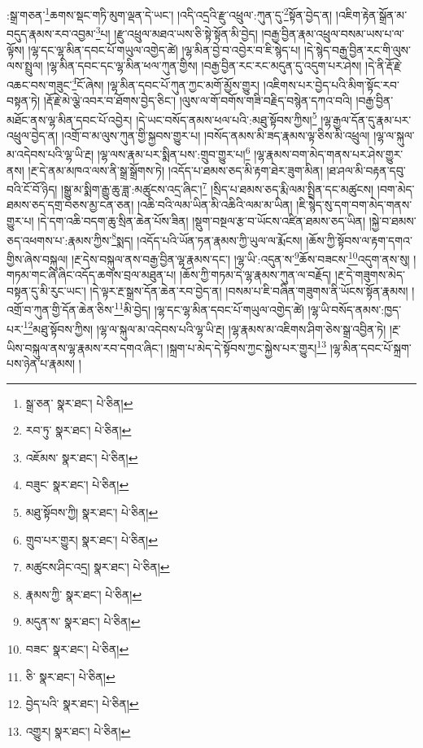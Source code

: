 :སྒྲ་གཅན་\footnote{སྒྲ་ཅན་  སྣར་ཐང་།  པེ་ཅིན། }ཆགས་སྡང་གཏི་མུག་ལྡན་དེ་ཡང་། །འདི་འདྲའི་རྫུ་འཕྲུལ་:ཀུན་དུ་\footnote{རབ་ཏུ་  སྣར་ཐང་།  པེ་ཅིན། }སྟོན་བྱེད་ན། །འཇིག་རྟེན་སྒྲོན་མ་བདུད་རྣམས་རབ་འབྱམ་\footnote{འཇོམས་  སྣར་ཐང་།  པེ་ཅིན། }པ། །རྫུ་འཕྲུལ་མཐའ་ཡས་ཅི་སྟེ་སྟོན་མི་བྱེད། །བརྒྱ་བྱིན་རྣམ་འཕྲུལ་བསམ་ཡས་པ་ལ་ལྟོས། །ལྷ་དང་ལྷ་མིན་དབང་པོ་གཡུལ་འགྱེད་ཚེ། །ལྷ་མིན་བྱེ་བ་འབྱེར་བ་ཇི་སྙེད་པ། །དེ་སྙེད་བརྒྱ་བྱིན་རང་གི་ལུས་ལས་སྤྲུལ། །ལྷ་མིན་དབང་དང་ལྷ་མིན་ཕལ་ཀུན་གྱིས། །བརྒྱ་བྱིན་རང་རང་མདུན་དུ་འདུག་པར་ཤེས། །དེ་ནི་རྡོ་རྗེ་འཆང་བས་གཟུང་\footnote{བཟུང་  སྣར་ཐང་།  པེ་ཅིན། }ངོ་ཞེས། །ལྷ་མིན་དབང་པོ་ཀུན་ཀྱང་མགོ་མྱོས་གྱུར། །འཇིགས་པར་བྱེད་པའི་མིག་སྟོང་རབ་བསྟན་ཏེ། །རྡོ་རྗེ་མེ་ལྕེ་འབར་བ་ཐོགས་བྱེད་ཅིང་། །ལུས་ལ་གོ་བགོས་གཟི་བརྗིད་བསྙེན་དཀའ་བའི། །བརྒྱ་བྱིན་མཐོང་ནས་ལྷ་མིན་དབང་པོ་འབྱེར། །དེ་ཡང་བསོད་ནམས་ཕལ་པའི་:མཐུ་སྟོབས་ཀྱིས།\footnote{མཐུ་སྟོབས་ཀྱི།  སྣར་ཐང་།  པེ་ཅིན། } །ལྷ་རྒྱལ་དོན་དུ་རྣམ་པར་འཕྲུལ་བྱེད་ན། །འགྲོ་བ་མ་ལུས་ཀུན་གྱི་སྐྱབས་གྱུར་པ། །བསོད་ནམས་མི་ཟད་རྣམས་ལྟ་ཅིས་མི་འཕྲུལ། །ལྷ་ལ་སྐུལ་མ་འདེབས་པའི་ལྷ་ཡི་རྔ། །ལྷ་ལས་རྣམ་པར་སྨིན་པས་:གྲུབ་གྱུར་པ།\footnote{གྲུབ་པར་གྱུར།  སྣར་ཐང་།  པེ་ཅིན། } །ལྷ་རྣམས་བག་མེད་གནས་པར་ཤེས་གྱུར་ནས། །རྔ་དེ་ནམ་མཁའ་ལས་ནི་སྒྲ་སྒྲོགས་ཏེ། །འདོད་པ་ཐམས་ཅད་མི་རྟག་ཐེར་ཟུག་མིན། །ཐ་ཤལ་མི་བརྟན་དབུ་བའི་ངོ་བོ་ཉིད། །སྒྱུ་མ་སྨིག་རྒྱུ་ཆུ་ཟླ་:མཚུངས་འདྲ་ཞིང་།\footnote{མཚུངས་ཤིང་འདྲ།  སྣར་ཐང་།  པེ་ཅིན། } །སྲིད་པ་ཐམས་ཅད་རྨི་ལམ་སྤྲིན་དང་མཚུངས། །བག་མེད་ཐམས་ཅད་དགྲ་བཅས་མྱ་ངན་ཅན། །འཆི་བའི་ལམ་ཡིན་མི་འཆིའི་ལམ་མ་ཡིན། །ཇི་སྙེད་སུ་དག་བག་མེད་གནས་གྱུར་པ། །དེ་དག་འཆི་བདག་ཆུ་སྲིན་ཆེན་པོས་ཟིན། །སྡུག་བསྔལ་རྩ་བ་ཡོངས་འཛིན་ཐམས་ཅད་ཡིན། །སྐྱེ་བ་ཐམས་ཅད་འཕགས་པ་:རྣམས་ཀྱིས་\footnote{རྣམས་ཀྱི་  སྣར་ཐང་།  པེ་ཅིན། }སྨད། །འདོད་པའི་ཡོན་ཏན་རྣམས་ཀྱི་ཡུལ་ལ་རྨོངས། །ཆོས་ཀྱི་སྟོབས་ལ་རྟག་དགའ་གྱིས་ཞེས་བསྐུལ། །རྔ་དེས་བསྐུལ་ནས་བརྒྱ་བྱིན་ལྷ་རྣམས་དང་། །ལྷ་ཡི་:འདུན་ས་\footnote{མདུན་ས་  སྣར་ཐང་།  པེ་ཅིན། }ཆོས་བཟངས་\footnote{བཟང་  སྣར་ཐང་།  པེ་ཅིན། }འདུག་ནས་སུ། །གཏམ་གང་ཞི་ཞིང་འདོད་ཆགས་བྲལ་མཐུན་པ། །ཆོས་ཀྱི་གཏམ་དེ་ལྷ་རྣམས་ཀུན་ལ་བརྗོད། །རྔ་དེ་གཟུགས་མེད་བསྟན་དུ་མི་རུང་ཡང་། །དེ་ལྟར་རྔ་སྒྲས་དོན་ཆེན་རབ་བྱེད་ན། །བསམ་པ་ཇི་བཞིན་གཟུགས་ནི་ཡོངས་སྟོན་རྣམས། །འགྲོ་བ་ཀུན་གྱི་དོན་ཆེན་ཅིས་\footnote{ཅི་  སྣར་ཐང་།  པེ་ཅིན། }མི་བྱེད། །ལྷ་དང་ལྷ་མིན་དབང་པོ་གཡུལ་འགྱེད་ཚེ། །ལྷ་ཡི་བསོད་ནམས་:ཁྱད་པར་\footnote{བྱེད་པའི་  སྣར་ཐང་།  པེ་ཅིན། }མཐུ་སྟོབས་ཀྱིས། །ལྷ་ལ་སྐུལ་མ་འདེབས་པའི་ལྷ་ཡི་རྔ། །ལྷ་རྣམས་མ་འཇིགས་ཤིག་ཅེས་སྒྲ་འབྱིན་ཏེ། །རྔ་ཡིས་བསྐུལ་ནས་ལྷ་རྣམས་རབ་དགའ་ཞིང་། །སྐྲག་པ་མེད་དེ་སྟོབས་ཀྱང་སྐྱེས་པར་གྱུར།\footnote{འགྱུར།  སྣར་ཐང་།  པེ་ཅིན། } །ལྷ་མིན་དབང་པོ་སྐྲག་པས་ཉེན་པ་རྣམས། །
